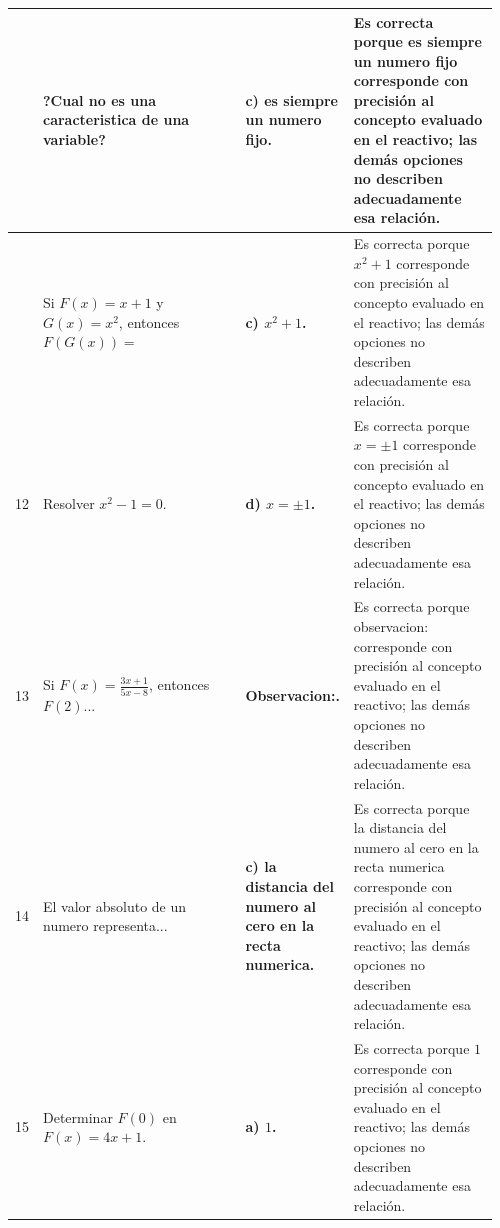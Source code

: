 \documentclass[
	spanish,
	letterpaper, oneside
]{article}
\begin{document}
\begin{landscape}
\begin{longtable}{@{}>{\centering\arraybackslash}p{0.035\linewidth}>{\raggedright\arraybackslash}p{0.42\linewidth}>{\raggedright\arraybackslash}p{0.20\linewidth}>{\raggedright\arraybackslash}p{0.30\linewidth}@{}}
10 & ?Cual no es una caracteristica de una variable? & \textbf{c) es siempre un numero fijo.} & Es correcta porque es siempre un numero fijo corresponde con precisión al concepto evaluado en el reactivo; las demás opciones no describen adecuadamente esa relación. \\
\midrule
11 & Si $F(x)=x+1$ y $G(x)=x^2$, entonces $F(G(x))=$ & \textbf{c) $x^2+1$.} & Es correcta porque $x^2+1$ corresponde con precisión al concepto evaluado en el reactivo; las demás opciones no describen adecuadamente esa relación. \\
\midrule
12 & Resolver $x^2-1=0$. & \textbf{d) $x=\pm 1$.} & Es correcta porque $x=\pm 1$ corresponde con precisión al concepto evaluado en el reactivo; las demás opciones no describen adecuadamente esa relación. \\
\midrule
13 & Si $F(x)=\frac{3x+1}{5x-8}$, entonces $F(2)$... & \textbf{Observacion:.} & Es correcta porque observacion: corresponde con precisión al concepto evaluado en el reactivo; las demás opciones no describen adecuadamente esa relación. \\
\midrule
14 & El valor absoluto de un numero representa... & \textbf{c) la distancia del numero al cero en la recta numerica.} & Es correcta porque la distancia del numero al cero en la recta numerica corresponde con precisión al concepto evaluado en el reactivo; las demás opciones no describen adecuadamente esa relación. \\
\midrule
15 & Determinar $F(0)$ en $F(x)=4x+1$. & \textbf{a) $1$.} & Es correcta porque $1$ corresponde con precisión al concepto evaluado en el reactivo; las demás opciones no describen adecuadamente esa relación. \\
\midrule

\end{longtable}
\end{landscape}
\end{document}
